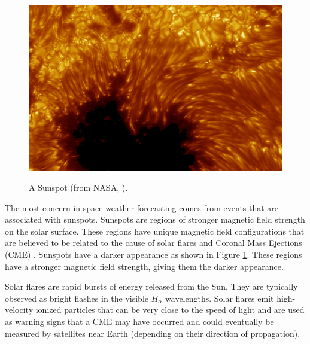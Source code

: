 \begin{figure}
    \centering
    \includegraphics[scale=0.1]{images/NASA_Sunspot.jpg}\\
    \caption{A Sunspot (from NASA, \citeyear{Sunspot}).}
    \label{fig:NASAsunspot}
    \figSpace
\end{figure}
The most concern in space weather forecasting comes from events that are
associated with sunspots. Sunspots are regions of stronger magnetic field
strength on the solar surface. These regions have unique magnetic field
configurations that are believed to be related to the
cause of solar flares and Coronal Mass Ejections (CME) \citep{Kallenrode}.
Sunspots have a darker appearance as shown in Figure \ref{fig:NASAsunspot}. These regions have a
stronger magnetic field strength, giving them the darker appearance.

Solar flares are rapid bursts of energy released from the Sun. They are
typically observed as bright flashes in the visible $H_\alpha$ wavelengths.
Solar flares emit high-velocity ionized particles that can be very close to the speed of light and are used as warning signs that a CME may have occurred and could eventually be
measured by satellites near Earth (depending on their direction of
propagation).

